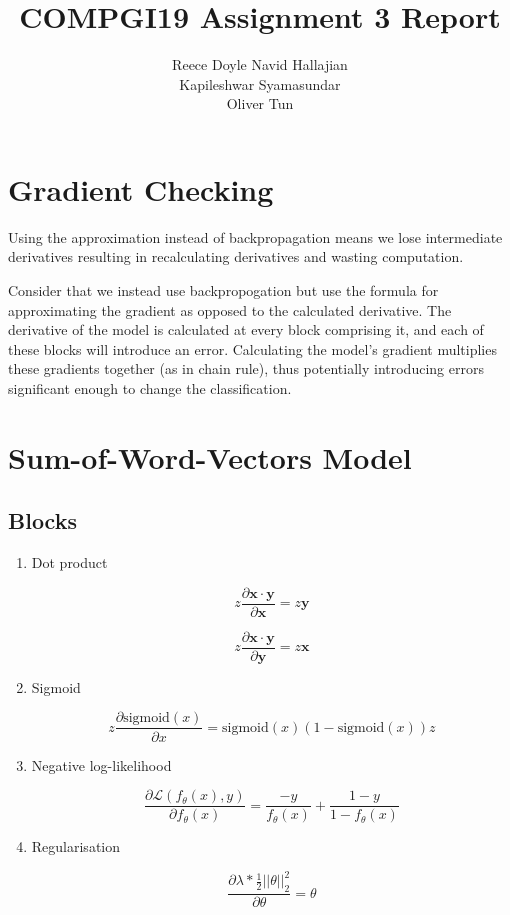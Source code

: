 \documentclass{article} %
\title{COMPGI19 Assignment 3 Report}
\author{
Reece Doyle
\And
Navid Hallajian \\
\And
Kapileshwar Syamasundar \\
\And
Oliver Tun \\
}
\begin{document}
\maketitle

\section{Gradient Checking}
Using the approximation instead of backpropagation means we lose intermediate derivatives resulting in recalculating derivatives and wasting computation.

Consider that we instead use backpropogation but use the formula for approximating the gradient as opposed to the calculated derivative. The derivative of the model is calculated at every block comprising it, and each of these blocks will introduce an error. Calculating the model's gradient multiplies these gradients together (as in chain rule), thus potentially introducing errors significant enough to change the classification. 

\section{Sum-of-Word-Vectors Model}

\subsection{Blocks}

\begin{enumerate}

\item Dot product

\[ z \frac{\partial {\mathbf{x} \cdot \mathbf{y}}}{\partial{\mathbf{x}}} = z \mathbf{y}  \]

\[ z \frac{\partial {\mathbf{x} \cdot \mathbf{y}}}{\partial{\mathbf{y}}} = z \mathbf{x} \]

\item Sigmoid

\[z \frac{\partial \text{sigmoid} (x)}{\partial{x}} =  \text{sigmoid}(x) (1 - \text{sigmoid}(x)) z\]

\item Negative log-likelihood

\[ \frac{\partial \mathcal{L}(f_{\theta}(x), y)}{\partial{f_{\theta}(x)}} = \frac{-y}{f_{\theta}(x)} + \frac{1 - y}{1 - f_{\theta}(x)} \]

\item Regularisation

\[ \frac{\partial \lambda * \frac{1}{2} {|| \theta ||}^2_2}{\partial \theta} = \theta \]

\end{enumerate}
\end{document}
